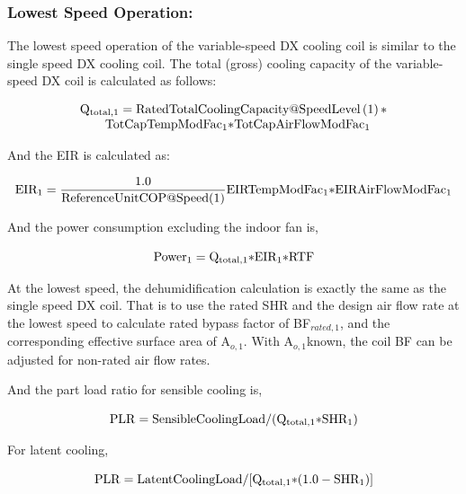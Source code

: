 \subsubsection{Lowest Speed Operation:}\label{lowest-speed-operation}

The lowest speed operation of the variable-speed DX cooling coil is similar to the single speed DX cooling coil. The total (gross) cooling capacity of the variable-speed DX coil is calculated as follows:

\begin{equation}
  \begin{array}{l}
    \rm{Q}_{\rm{total},1} = \rm{RatedTotalCoolingCapacity} @ \rm{SpeedLevel} \left( 1 \right) \rm{*} \\
    \quad \quad \rm{TotCapTempModFa} \rm{c}_1 \rm{*TotCapAirFlowModFa} \rm{c}_1
  \end{array}
\end{equation}

And the EIR is calculated as:

\begin{equation}
\rm{EI} \rm{R}_1 = \frac{1.0}{\rm{ReferenceUnitCOP} @ \rm{Speed}(1)}{\rm{EIRTempModFa}}{\rm{c}_1}{\rm{*EIRAirFlowModFa}}{\rm{c}_1}
\end{equation}

And the power consumption excluding the indoor fan is,

\begin{equation}
{\rm{Powe}}{{\rm{r}}_1} = {{\rm{Q}}_{{\rm{total}},1}}{\rm{*EI}}{{\rm{R}}_1}{\rm{*RTF}}
\end{equation}

At the lowest speed, the dehumidification calculation is exactly the same as the single speed DX coil. That is to use the rated SHR and the design air flow rate at the lowest speed to calculate rated bypass factor of BF\(_{rated,1}\), and the corresponding effective surface area of A\(_{o,1}\). With A\(_{o,1}\)known, the coil BF can be adjusted for non-rated air flow rates.

And the part load ratio for sensible cooling is,

\begin{equation}
{\rm{PLR}} = {\rm{SensibleCoolingLoad}}/({{\rm{Q}}_{{\rm{total}},1}}{\rm{*SH}}{{\rm{R}}_1})
\end{equation}

For latent cooling,

\begin{equation}
{\rm{PLR}} = {\rm{LatentCoolingLoad}}/[{{\rm{Q}}_{{\rm{total}},1}}{\rm{*}}(1.0 - {\rm{SH}}{{\rm{R}}_1})]
\end{equation}

